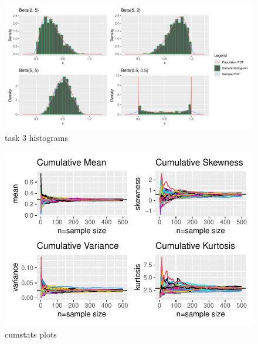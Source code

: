 \documentclass{article}\usepackage[]{graphicx}\usepackage[]{xcolor}
\makeatletter
\def\maxwidth{ %
  \ifdim\Gin@nat@width>\linewidth
    \linewidth
  \else
    \Gin@nat@width
  \fi
}
\newenvironment{knitrout}{}{} %
\makeatother
\begin{document}
\begin{figure}[H]
 \begin{center}
\begin{knitrout}
\color{fgcolor}
\includegraphics[width=\maxwidth]{figure/unnamed-chunk-3-1} 
\end{knitrout}
 \caption{task 3 histograms}
 \label{plot2} %
 \end{center}
 \end{figure}

\begin{figure}[H]
 \begin{center}
\begin{knitrout}
\color{fgcolor}
\includegraphics[width=\maxwidth]{figure/unnamed-chunk-4-1} 
\end{knitrout}
 \caption{cumstats plots}
 \label{plot3} %
 \end{center}
 \end{figure}
\end{document}
